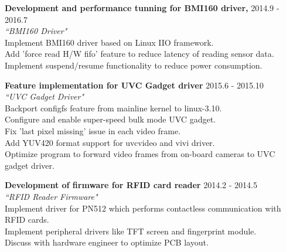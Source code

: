 \documentclass{res}
\begin{document}
\begin{resume}
   {\bf Development and performance tunning for BMI160 driver,} {\hfill 2014.9 - 2016.7\\}
   \emph {``BMI160 Driver"}\\
Implement BMI160 driver based on Linux IIO framework.\\
Add 'force read H/W fifo' feature to reduce latency of reading sensor data.\\
Implement suspend/resume functionality to reduce power consumption.

   {\bf Feature implementation for UVC Gadget driver} {\hfill 2015.6 - 2015.10\\}
   \emph {``UVC Gadget Driver"}\\
Backport configfs feature from mainline kernel to linux-3.10.\\
Configure and enable super-speed bulk mode UVC gadget.\\
Fix 'last pixel missing' issue in each video frame.\\
Add YUV420 format support for uvcvideo and vivi driver.\\
Optimize program to forward video frames from on-board cameras to UVC gadget driver.

   {\bf Development of firmware for RFID card reader} {\hfill 2014.2 - 2014.5\\}
   \emph {``RFID Reader Firmware"}\\
Implement driver for PN512 which performs contactless communication with RFID cards.\\
Implement peripheral drivers like TFT screen and fingerprint module.\\
Discuss with hardware engineer to optimize PCB layout.

%


\end{resume}
\end{document}
